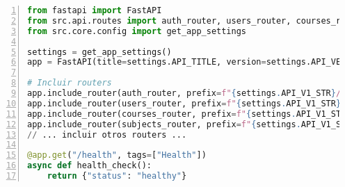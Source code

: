 \begin{lstlisting}[language=python, basicstyle=\footnotesize\ttfamily, caption={Agrupación de routers en la aplicación principal FastAPI (\texttt{main.py} - extracto).},label={lst:apx_mainFastAPI_content}, frame=tb, numbers=left, numberstyle=\tiny\color{gray}]
from fastapi import FastAPI
from src.api.routes import auth_router, users_router, courses_router, subjects_router # etc.
from src.core.config import get_app_settings

settings = get_app_settings()
app = FastAPI(title=settings.API_TITLE, version=settings.API_VERSION)

# Incluir routers
app.include_router(auth_router, prefix=f"{settings.API_V1_STR}/auth", tags=["Authentication"])
app.include_router(users_router, prefix=f"{settings.API_V1_STR}/users", tags=["Users"])
app.include_router(courses_router, prefix=f"{settings.API_V1_STR}/courses", tags=["Courses"])
app.include_router(subjects_router, prefix=f"{settings.API_V1_STR}/subjects", tags=["Subjects"])
// ... incluir otros routers ...

@app.get("/health", tags=["Health"])
async def health_check():
    return {"status": "healthy"}
\end{lstlisting}


% 
% 
% 


